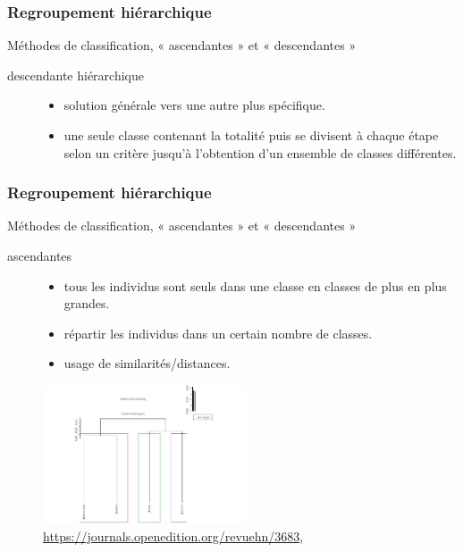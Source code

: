 \begin{frame}
  \frametitle{Regroupement hiérarchique}
  
  Méthodes de classification, « ascendantes » et « descendantes »
\begin{description}
\item  [descendante hiérarchique] 
\begin{itemize}
\item {} solution générale vers une autre plus spécifique.
\item {} une seule classe contenant la totalité puis se divisent à chaque étape selon un critère jusqu’à l’obtention d’un ensemble de classes différentes.
\end{itemize}
\end{description} 
\end{frame}

\begin{frame}
  \frametitle{Regroupement hiérarchique}
 Méthodes de classification, « ascendantes » et « descendantes »  
 \begin{description} 
\item [ascendantes]
\begin{itemize}
\item {} tous les individus sont seuls dans une classe  en classes de plus en plus grandes. 
\item {} répartir les individus dans un certain nombre de classes.
\item {} usage de similarités/distances.
\end{itemize}
\end{description} 
 
\begin{figure}
  \includegraphics[width=6cm]{images/dendrogramme_img-3.jpg}
  \caption{\url{https://journals.openedition.org/revuehn/3683}, \cite{Melancon2023}}
  \end{figure}

  
\end{frame}

